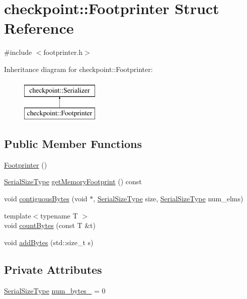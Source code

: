 \hypertarget{structcheckpoint_1_1_footprinter}{}\section{checkpoint\+:\+:Footprinter Struct Reference}
\label{structcheckpoint_1_1_footprinter}


{\ttfamily \#include $<$footprinter.\+h$>$}

Inheritance diagram for checkpoint\+:\+:Footprinter\+:\begin{figure}[H]
\begin{center}
\leavevmode
\includegraphics[height=2.000000cm]{structcheckpoint_1_1_footprinter}
\end{center}
\end{figure}
\subsection*{Public Member Functions}
\begin{DoxyCompactItemize}
\item 
\hyperlink{structcheckpoint_1_1_footprinter_a79d7f7f0b753be09ac841dfd1af4a4d4}{Footprinter} ()
\item 
\hyperlink{namespacecheckpoint_a083f6674da3f94c2901b18c6d238217c}{Serial\+Size\+Type} \hyperlink{structcheckpoint_1_1_footprinter_ad3131f63bf74b018c66e9fe3f0f31fca}{get\+Memory\+Footprint} () const
\item 
void \hyperlink{structcheckpoint_1_1_footprinter_a88872ac85c679331c2bd4ab5d26e585a}{contiguous\+Bytes} (void $\ast$, \hyperlink{namespacecheckpoint_a083f6674da3f94c2901b18c6d238217c}{Serial\+Size\+Type} size, \hyperlink{namespacecheckpoint_a083f6674da3f94c2901b18c6d238217c}{Serial\+Size\+Type} num\+\_\+elms)
\item 
{\footnotesize template$<$typename T $>$ }\\void \hyperlink{structcheckpoint_1_1_footprinter_a68f3c6a41c6f5f15b596dec55ab0ba5f}{count\+Bytes} (const T \&t)
\item 
void \hyperlink{structcheckpoint_1_1_footprinter_a01c5c58e7d05c9a7f3eb1caeee423867}{add\+Bytes} (std\+::size\+\_\+t s)
\end{DoxyCompactItemize}
\subsection*{Private Attributes}
\begin{DoxyCompactItemize}
\item 
\hyperlink{namespacecheckpoint_a083f6674da3f94c2901b18c6d238217c}{Serial\+Size\+Type} \hyperlink{structcheckpoint_1_1_footprinter_aa1e1872e87895430c567eb893b6f74bf}{num\+\_\+bytes\+\_\+} = 0
\end{DoxyCompactItemize}
